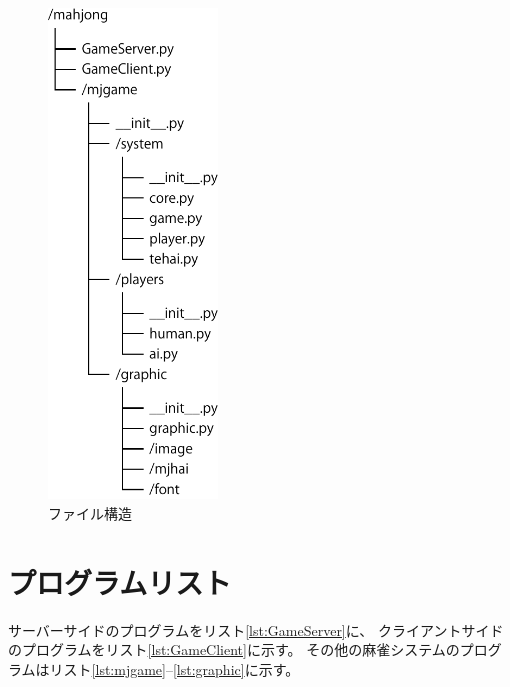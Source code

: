 \documentclass[a4j,titlepage]{jsarticle}
\begin{document}
\begin{figure}[H]
  \centering
  \includegraphics[height=13cm]{images/file.pdf}
  \caption{ファイル構造}
  \label{fig:file}
\end{figure}

\newpage
\section{プログラムリスト}
サーバーサイドのプログラムをリスト\ref{lst:GameServer}に、
クライアントサイドのプログラムをリスト\ref{lst:GameClient}に示す。
その他の麻雀システムのプログラムはリスト\ref{lst:mjgame}--\ref{lst:graphic}に示す。










\end{document}
